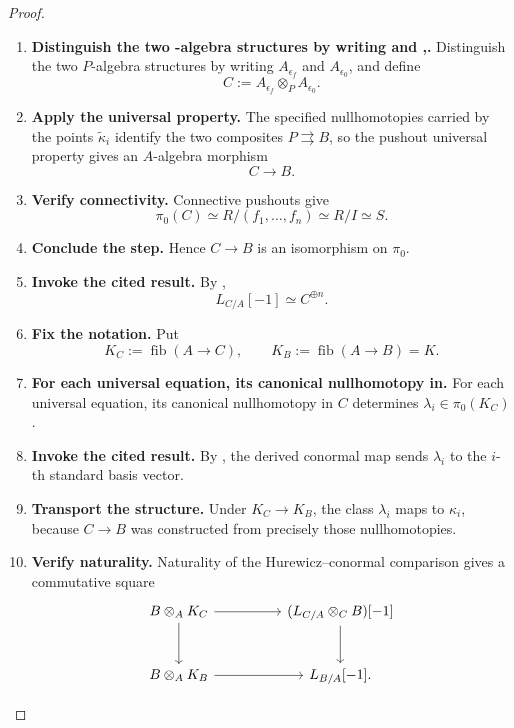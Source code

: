 \begin{proof}
\begin{enumerate}[label=\textup{(\arabic*)}]
    \item \textbf{Distinguish the two -algebra structures by writing and ,.}
    Distinguish the two \(P\)-algebra structures by writing \(A_{\epsilon_f}\) and \(A_{\epsilon_0}\),
    and define
    \[
            C:=A_{\epsilon_f}\otimes_P A_{\epsilon_0}.
        \]

    \item \textbf{Apply the universal property.}
    The specified nullhomotopies carried by the points \(\widetilde\kappa_i\) identify the two composites
    \(P\rightrightarrows B\), so the pushout universal property gives an \(A\)-algebra morphism
    \[
            C\longrightarrow B.
        \]

    \item \textbf{Verify connectivity.}
    Connective pushouts give
    \[
            \pi_0(C)
            \simeq
            R/(f_1,\ldots,f_n)
            \simeq
            R/I
            \simeq
            S.
        \]

    \item \textbf{Conclude the step.}
    Hence \(C\to B\) is an isomorphism on \(\pi_0\).

    \item \textbf{Invoke the cited result.}
    By ,
    \[
            L_{C/A}[-1]\simeq C^{\oplus n}.
        \]

    \item \textbf{Fix the notation.}
    Put
    \[
            K_C:=\operatorname{fib}(A\to C),
            \qquad
            K_B:=\operatorname{fib}(A\to B)=K.
        \]

    \item \textbf{For each universal equation, its canonical nullhomotopy in.}
    For each universal equation, its canonical nullhomotopy in \(C\) determines
    \(\lambda_i\in\pi_0(K_C)\).

    \item \textbf{Invoke the cited result.}
    By , the derived conormal map sends \(\lambda_i\)
    to the \(i\)-th standard basis vector.

    \item \textbf{Transport the structure.}
    Under \(K_C\to K_B\), the class \(\lambda_i\) maps to \(\kappa_i\), because \(C\to B\) was
    constructed from precisely those nullhomotopies.

    \item \textbf{Verify naturality.}
    Naturality of the Hurewicz--conormal comparison gives a commutative square
    \[
        \begin{tikzcd}[column sep=huge, row sep=large]
            B\otimes_AK_C \arrow[r] \arrow[d]
                & (L_{C/A}\otimes_CB)[-1] \arrow[d]
            \\
            B\otimes_AK_B \arrow[r]
                & L_{B/A}[-1].
        \end{tikzcd}
        \]


\end{enumerate}
\end{proof}
